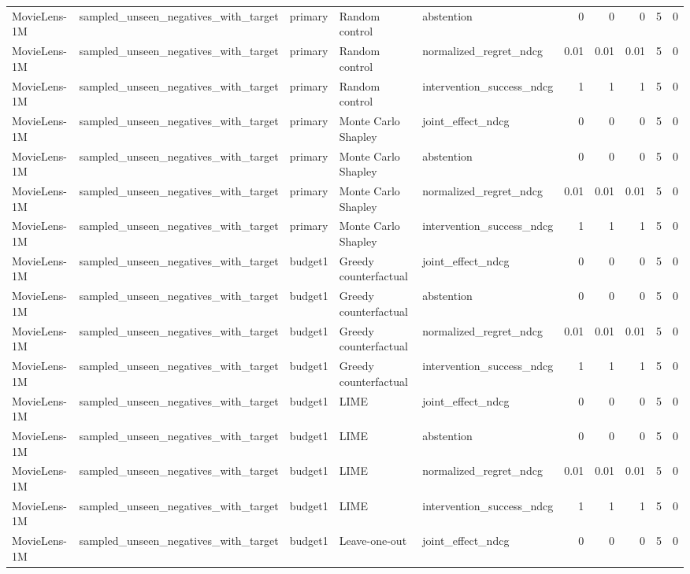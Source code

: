 \begin{table}[t]
{\begin{tabular}{lllllrrrrr}
MovieLens-1M & sampled\_unseen\_negatives\_with\_target & primary & Random control & abstention & 0 & 0 & 0 & 5 & 0 \\
MovieLens-1M & sampled\_unseen\_negatives\_with\_target & primary & Random control & normalized\_regret\_ndcg & 0.01 & 0.01 & 0.01 & 5 & 0 \\
MovieLens-1M & sampled\_unseen\_negatives\_with\_target & primary & Random control & intervention\_success\_ndcg & 1 & 1 & 1 & 5 & 0 \\
MovieLens-1M & sampled\_unseen\_negatives\_with\_target & primary & Monte Carlo Shapley & joint\_effect\_ndcg & 0 & 0 & 0 & 5 & 0 \\
MovieLens-1M & sampled\_unseen\_negatives\_with\_target & primary & Monte Carlo Shapley & abstention & 0 & 0 & 0 & 5 & 0 \\
MovieLens-1M & sampled\_unseen\_negatives\_with\_target & primary & Monte Carlo Shapley & normalized\_regret\_ndcg & 0.01 & 0.01 & 0.01 & 5 & 0 \\
MovieLens-1M & sampled\_unseen\_negatives\_with\_target & primary & Monte Carlo Shapley & intervention\_success\_ndcg & 1 & 1 & 1 & 5 & 0 \\
MovieLens-1M & sampled\_unseen\_negatives\_with\_target & budget1 & Greedy counterfactual & joint\_effect\_ndcg & 0 & 0 & 0 & 5 & 0 \\
MovieLens-1M & sampled\_unseen\_negatives\_with\_target & budget1 & Greedy counterfactual & abstention & 0 & 0 & 0 & 5 & 0 \\
MovieLens-1M & sampled\_unseen\_negatives\_with\_target & budget1 & Greedy counterfactual & normalized\_regret\_ndcg & 0.01 & 0.01 & 0.01 & 5 & 0 \\
MovieLens-1M & sampled\_unseen\_negatives\_with\_target & budget1 & Greedy counterfactual & intervention\_success\_ndcg & 1 & 1 & 1 & 5 & 0 \\
MovieLens-1M & sampled\_unseen\_negatives\_with\_target & budget1 & LIME & joint\_effect\_ndcg & 0 & 0 & 0 & 5 & 0 \\
MovieLens-1M & sampled\_unseen\_negatives\_with\_target & budget1 & LIME & abstention & 0 & 0 & 0 & 5 & 0 \\
MovieLens-1M & sampled\_unseen\_negatives\_with\_target & budget1 & LIME & normalized\_regret\_ndcg & 0.01 & 0.01 & 0.01 & 5 & 0 \\
MovieLens-1M & sampled\_unseen\_negatives\_with\_target & budget1 & LIME & intervention\_success\_ndcg & 1 & 1 & 1 & 5 & 0 \\
MovieLens-1M & sampled\_unseen\_negatives\_with\_target & budget1 & Leave-one-out & joint\_effect\_ndcg & 0 & 0 & 0 & 5 & 0 \\

\end{tabular}}
\end{table}
